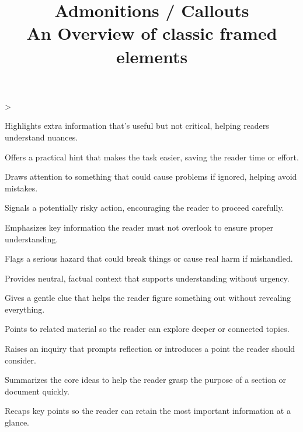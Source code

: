 \documentclass[twoside]{article}
\title{Admonitions / Callouts\\[0.5em]\large An Overview of \textbf{classic} framed elements}
\author{}\date{}
\makeatletter
\newcommand\tsreplayfn{
\ts@loopcnt\z@
\loop
\advance\ts@loopcnt\@ne
\ifnum\ts@loopcnt>\ts@affilcnt\else
\xdef\@thefnmark{\csname ts@affilM\the\ts@loopcnt\endcsname}
\@footnotetext{\csname ts@affilT\the\ts@loopcnt\endcsname}
\repeat
}
\makeatother
\begin{document}
\twocolumn[{
\maketitle
}]
\tsreplayfn
\begin{tscallout}[kind=note]
Highlights extra information that's useful but not critical, helping readers understand nuances.
\end{tscallout}
\begin{tscallout}[kind=tip]
Offers a practical hint that makes the task easier, saving the reader time or effort.
\end{tscallout}
\begin{tscallout}[kind=warning]
Draws attention to something that could cause problems if ignored, helping avoid mistakes.
\end{tscallout}
\begin{tscallout}[kind=caution]
Signals a potentially risky action, encouraging the reader to proceed carefully.
\end{tscallout}
\begin{tscallout}[kind=important]
Emphasizes key information the reader must not overlook to ensure proper understanding.
\end{tscallout}
\begin{tscallout}[kind=danger]
Flags a serious hazard that could break things or cause real harm if mishandled.
\end{tscallout}
\begin{tscallout}[kind=info]
Provides neutral, factual context that supports understanding without urgency.
\end{tscallout}
\begin{tscallout}[kind=hint]
Gives a gentle clue that helps the reader figure something out without revealing everything.
\end{tscallout}
\begin{tscallout}[kind=seealso]
Points to related material so the reader can explore deeper or connected topics.
\end{tscallout}
\begin{tscallout}[kind=question]
Raises an inquiry that prompts reflection or introduces a point the reader should consider.
\end{tscallout}
\begin{tscallout}[kind=abstract]
Summarizes the core ideas to help the reader grasp the purpose of a section or document quickly.
\end{tscallout}
\begin{tscallout}[kind=summary]
Recaps key points so the reader can retain the most important information at a glance.
\end{tscallout}
\end{document}
